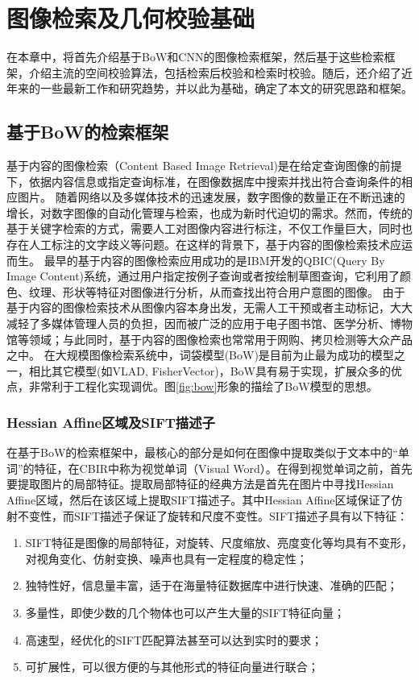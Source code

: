 
\chapter{图像检索及几何校验基础}
在本章中，将首先介绍基于BoW和CNN的图像检索框架，然后基于这些检索框架，介绍主流的空间校验算法，包括检索后校验和检索时校验。随后，还介绍了近年来的一些最新工作和研究趋势，并以此为基础，确定了本文的研究思路和框架。

\section{基于BoW的检索框架}
基于内容的图像检索（Content Based Image Retrieval)是在给定查询图像的前提下，依据内容信息或指定查询标准，在图像数据库中搜索并找出符合查询条件的相应图片\cite{cyy2007img}。 
随着网络以及多媒体技术的迅速发展，数字图像的数量正在不断迅速的增长，对数字图像的自动化管理与检索，也成为新时代迫切的需求。然而，传统的基于关键字检索的方式，需要人工对图像内容进行标注，不仅工作量巨大，同时也存在人工标注的文字歧义等问题。在这样的背景下，基于内容的图像检索技术应运而生。
最早的基于内容的图像检索应用成功的是IBM开发的QBIC\cite{qbic}(Query By Image Content)系统，通过用户指定按例子查询或者按绘制草图查询，它利用了颜色、纹理、形状等特征对图像进行分析，从而查找出符合用户意图的图像。
由于基于内容的图像检索技术从图像内容本身出发，无需人工干预或者主动标记，大大减轻了多媒体管理人员的负担，因而被广泛的应用于电子图书馆、医学分析、博物馆等领域；与此同时，基于内容的图像检索也常常用于网购、拷贝检测等大众产品之中。
在大规模图像检索系统中，词袋模型(BoW)是目前为止最为成功的模型之一\cite{arandjelovic2012three}，相比其它模型(如VLAD\cite{jegou2010aggregating}, FisherVector\cite{perronnin2007fisher})，BoW具有易于实现，扩展众多的优点，非常利于工程化实现调优。图\ref{fig:bow}形象的描绘了BoW模型的思想。

\subsection{Hessian Affine区域及SIFT描述子}
在基于BoW的检索框架中，最核心的部分是如何在图像中提取类似于文本中的“单词”的特征，在CBIR中称为视觉单词（Visual Word）。在得到视觉单词之前，首先要提取图片的局部特征。提取局部特征的经典方法是首先在图片中寻找Hessian Affine区域\cite{mikolajczyk2004scale}，然后在该区域上提取SIFT\cite{lowe2004distinctive}描述子。其中Hessian Affine区域保证了仿射不变性，而SIFT描述子保证了旋转和尺度不变性。SIFT描述子具有以下特征：
\begin{enumerate}
	\item SIFT特征是图像的局部特征，对旋转、尺度缩放、亮度变化等均具有不变形，对视角变化、仿射变换、噪声也具有一定程度的稳定性；
	\item 独特性好，信息量丰富，适于在海量特征数据库中进行快速、准确的匹配；
	\item 多量性，即使少数的几个物体也可以产生大量的SIFT特征向量；
	\item 高速型，经优化的SIFT匹配算法甚至可以达到实时的要求；
	\item 可扩展性，可以很方便的与其他形式的特征向量进行联合；
\end{enumerate}

